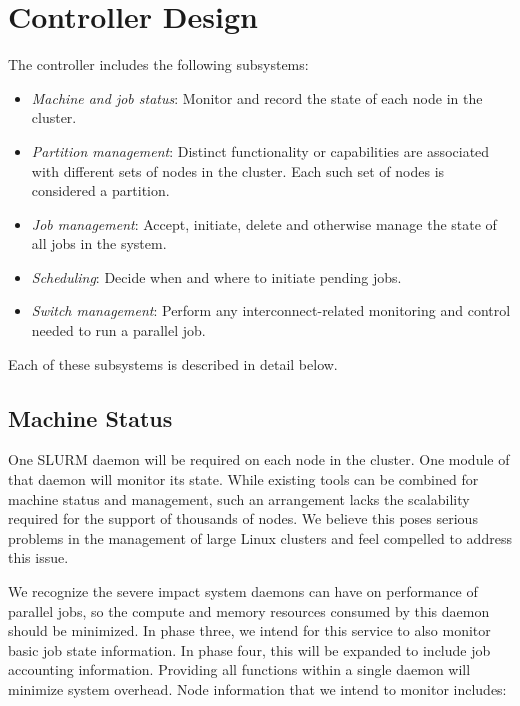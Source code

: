 
\section{Controller Design}


The controller includes the following subsystems:

\begin{itemize}
\item {\em Machine and job status}: Monitor and record the state of each 
node in the cluster.

\item {\em Partition management}: Distinct functionality or capabilities 
are associated with different sets of nodes in the cluster.  Each such set 
of nodes is considered a partition. 

\item {\em Job management}: Accept, initiate, delete and otherwise manage 
the state of all jobs in the system.

\item {\em Scheduling}: Decide when and where to initiate pending jobs.

\item {\em Switch management}: Perform any interconnect-related 
monitoring and control needed to run a parallel job.

\end{itemize}

Each of these subsystems is described in detail below.

\subsection{Machine Status}

One SLURM daemon will be required on each node in the cluster.
One module of that daemon will monitor its state.
While existing tools can be combined for machine status and management, such an
arrangement lacks the scalability required for the support of thousands of
nodes. We believe this poses serious problems in the management of large Linux
clusters and feel compelled to address this issue. 

We recognize the severe impact system daemons can have on performance of
parallel jobs, so the compute and memory resources consumed by this daemon
should be minimized. In phase three, we intend for this service to also monitor
basic job state information. In phase four, this will be expanded to include 
job accounting information. Providing all functions
within a single daemon will minimize system overhead. Node information that we
intend to monitor includes:

